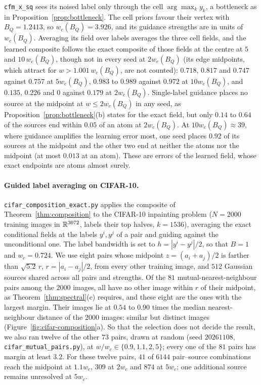 \documentclass{article} %
\theoremstyle{plain}
\theoremstyle{definition}
\theoremstyle{remark}
\begin{document}
\texttt{cfm\_x\_sq} sees its noised label only through the cell $\arg\max_k y_k$, a bottleneck as in
Proposition~\ref{prop:bottleneck}. The cell priors favour their vertex with $B_Q=1.2413$, so
$w_c(B_Q)=3.926$, and its guidance strengths are in units of $w_c(B_Q)$. Averaging its field over
labels averages the three cell fields, and the learned composite follows the exact composite of
those fields at the centre at $5$ and $10\,w_c(B_Q)$, though not in every seed at $2w_c(B_Q)$ (its
edge midpoints, which attract for $w>1.001\,w_c(B_Q)$, are not counted): $0.718$, $0.817$ and
$0.747$ against $0.757$ at $5w_c(B_Q)$, $0.983$ to $0.989$ against $0.972$ at $10w_c(B_Q)$, and
$0.135$, $0.226$ and $0$ against $0.179$ at $2w_c(B_Q)$. Single-label
guidance places no source at the midpoint at $w\le2w_c(B_Q)$ in any seed, as
Proposition~\ref{prop:bottleneck}(b) states for the exact field, but only $0.14$ to $0.64$ of the
sources end within $0.05$ of an atom at $2w_c(B_Q)$. At $10w_c(B_Q)\approx39$, where guidance
amplifies the learning error most, one seed places $0.92$ of its sources at the midpoint and the
other two end at neither the atoms nor the midpoint (at most $0.013$ at an atom). These are errors
of the learned field, whose exact endpoints are atoms almost surely.

\paragraph{Guided label averaging on CIFAR-10.}
\label{app:cifar-composition}
\texttt{cifar\_composition\_exact.py} applies the composite of Theorem~\ref{thm:composition} to the
CIFAR-10 inpainting problem ($N=2000$ training images in $\mathbb{R}^{3072}$, labels their top
halves, $k=1536$), averaging the exact conditional fields at the labels $y^i,y^j$ of a pair and guiding
against the unconditional one. The label bandwidth is set to $h=|y^i-y^j|/2$, so that $B=1$ and
$w_c=0.724$. We use eight pairs whose midpoint $z=(a_i+a_j)/2$ is farther than
$\sqrt{5.2}\,r$, $r=|a_i-a_j|/2$, from every other training image, and $512$ Gaussian sources shared across all pairs and strengths. Of the $81$ mutual-nearest-neighbour pairs among the $2000$ images, all have no other
image within $r$ of their midpoint, as Theorem~\ref{thm:spectral}(c) requires, and these eight
are the ones with the largest margin. Their images lie at $0.54$ to $0.90$ times the median
nearest-neighbour distance of the $2000$ images: similar but distinct images
(Figure~\ref{fig:cifar-composition}a). So that the selection does not decide the result, we also
ran twelve of the other $73$ pairs, drawn at random (seed $20261108$,
\texttt{cifar\_mutual\_pairs.py}), at $w/w_c\in\{0.9,1.1,2,5\}$; every one of the $81$ pairs has
margin at least $3.2$. For these twelve pairs, $41$ of $6144$ pair--source combinations reach the midpoint at $1.1w_c$,
$309$ at $2w_c$ and $874$ at $5w_c$; one additional source remains unresolved at $5w_c$.
\end{document}
